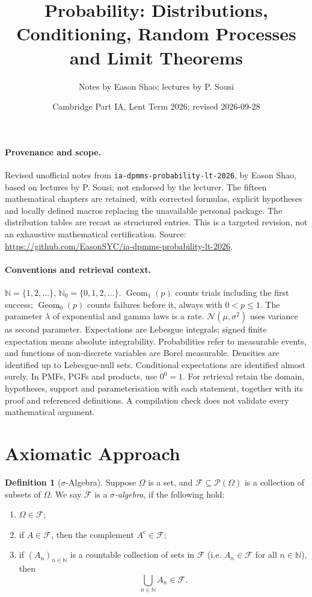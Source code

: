 \documentclass[11pt]{article}
\title{Probability: Distributions, Conditioning, Random Processes and Limit Theorems}
\author{Notes by Eason Shao; lectures by P. Sousi}
\date{Cambridge Part IA, Lent Term 2026; revised 2026-09-28}
\numberwithin{equation}{section}
\theoremstyle{definition}
\newtheorem{definition}[theorem]{Definition}
\theoremstyle{remark}
\newcommand{\pqty}[1]{\left(#1\right)}
\newcommand{\NN}{\mathbb N}
\newcommand{\compl}{^{\mathrm c}}
\newcommand{\powerset}{\mathcal P}
\newcommand{\eventSpace}{\mathcal F}
\newcommand{\GeomOne}{\operatorname{Geom}_1}
\newcommand{\GeomZero}{\operatorname{Geom}_0}
\begin{document}
\maketitle
\paragraph{Provenance and scope.}
Revised unofficial notes from \texttt{ia-dpmms-probability-lt-2026}, by Eason
Shao, based on lectures by P. Sousi; not endorsed by the lecturer.
The fifteen mathematical chapters are retained, with corrected formulas,
explicit hypotheses and locally defined macros replacing the unavailable
personal package. The distribution tables are recast as structured entries.
This is a targeted revision, not an exhaustive mathematical certification.
Source: \url{https://github.com/EasonSYC/ia-dpmms-probability-lt-2026}.
\paragraph{Conventions and retrieval context.}
\(\NN=\{1,2,\ldots\}\), \(\NN_0=\{0,1,2,\ldots\}\).
\(\GeomOne(p)\) counts trials including the first success; \(\GeomZero(p)\)
counts failures before it, always with \(0<p\le1\).
The parameter \(\lambda\) of exponential and gamma laws is a rate.
\(\mathcal N(\mu,\sigma^2)\) uses variance as second parameter.
Expectations are Lebesgue integrals; signed finite expectation means absolute
integrability. Probabilities refer to measurable events, and functions of
non-discrete variables are Borel measurable. Densities are identified up to
Lebesgue-null sets. Conditional expectations are identified almost surely.
In PMFs, PGFs and products, use \(0^0=1\).
For retrieval retain the domain, hypotheses, support and parameterisation with
each statement, together with its proof and referenced definitions. A compilation
check does not validate every mathematical argument.
\tableofcontents
\section{Axiomatic Approach}\label{probability-section-01}

\begin{definition}[\(\sigma\)-Algebra]\label{probability-definition-001}
    \label{probability-def:sigma-algebra}%
    Suppose \(\Omega\) is a set, and \(\eventSpace \subseteq \powerset\pqty{\Omega}\) is a collection of subsets of \(\Omega\). We say \(\eventSpace\) is a \emph{\(\sigma\)-algebra}, if the following hold:
    \begin{enumerate}
        \item \(\Omega \in \eventSpace\);
        \item if \(A \in \eventSpace\), then the complement \(A\compl \in \eventSpace\);
        \item if \(\pqty{A_n}_{n \in \NN}\) is a countable collection of sets in \(\eventSpace\) (i.e. \(A_n \in \eventSpace\) for all \(n \in \NN\)), then
        \[
            \bigcup_{n \in \NN} A_n \in \eventSpace.
        \]
    \end{enumerate}
\end{definition}
\end{document}
